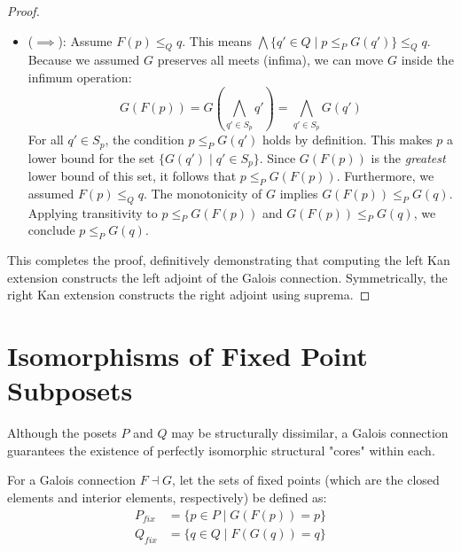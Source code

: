 \begin{proof}
\begin{itemize}
    \item ($\implies$): Assume $F(p) \leq_Q q$. This means $\bigwedge \{ q' \in Q \mid p \leq_P G(q') \} \leq_Q q$. Because we assumed $G$ preserves all meets (infima), we can move $G$ inside the infimum operation:
    \[ G(F(p)) = G\left(\bigwedge_{q' \in S_p} q'\right) = \bigwedge_{q' \in S_p} G(q') \]
    For all $q' \in S_p$, the condition $p \leq_P G(q')$ holds by definition. This makes $p$ a lower bound for the set $\{ G(q') \mid q' \in S_p \}$. Since $G(F(p))$ is the \emph{greatest} lower bound of this set, it follows that $p \leq_P G(F(p))$.
    Furthermore, we assumed $F(p) \leq_Q q$. The monotonicity of $G$ implies $G(F(p)) \leq_P G(q)$.
    Applying transitivity to $p \leq_P G(F(p))$ and $G(F(p)) \leq_P G(q)$, we conclude $p \leq_P G(q)$.
\end{itemize}
This completes the proof, definitively demonstrating that computing the left Kan extension constructs the left adjoint of the Galois connection. Symmetrically, the right Kan extension constructs the right adjoint using suprema.
\end{proof}

\section{Isomorphisms of Fixed Point Subposets}

Although the posets $P$ and $Q$ may be structurally dissimilar, a Galois connection guarantees the existence of perfectly isomorphic structural "cores" within each.

\begin{definition}
For a Galois connection $F \dashv G$, let the sets of fixed points (which are the closed elements and interior elements, respectively) be defined as:
\begin{align*}
P_{fix} &= \{ p \in P \mid G(F(p)) = p \} \\
Q_{fix} &= \{ q \in Q \mid F(G(q)) = q \}
\end{align*}
\end{definition}


